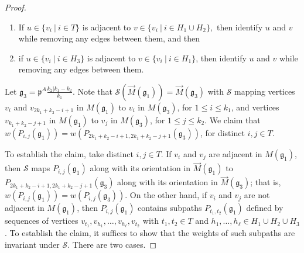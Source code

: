 \documentclass[letterpaper,10pt]{article}
\begin{document}
\begin{proof}
\begin{enumerate}
    \item If $u\in \{v_i~|~i\in T\}$ is adjacent to $v\in \{v_i~|~i\in H_1\cup H_2\},$ then identify $u$ and $v$ while removing any edges between them, and then
    \item if $u\in \{v_i~|~i\in H_3\}$ is adjacent to $v\in \{v_i~|~i\in H_1\}$, then identify $u$ and $v$ while removing any edges between them.
\end{enumerate}
Let $\mathfrak{g}_3=\mathfrak{p}^A\frac{k_2|k_1-k_2}{k_1}.$ Note that $\mathcal{S}(\overrightarrow{M}(\mathfrak{g}_1))=\overrightarrow{M}(\mathfrak{g}_3)$ with $\mathcal{S}$ mapping vertices $v_{i}$ and $v_{2k_1+k_2-i+1}$ in $M(\mathfrak{g}_1)$ to $v_{i}$ in $M(\mathfrak{g}_3)$, for $1\le i\le k_1$, and vertices $v_{k_1+k_2-j+1}$ in $M(\mathfrak{g}_1)$ to $v_{j}$ in $M(\mathfrak{g}_3)$, for $1\le j\le k_2$. We claim that $w(P_{i,j}(\mathfrak{g}_1))=w(P_{2k_1+k_2-i+1,2k_1+k_2-j+1}(\mathfrak{g}_3))$, for distinct $i,j\in T$.

To establish the claim, take distinct $i,j\in T$. If $v_{i}$ and $v_{j}$ are adjacent in $M(\mathfrak{g}_1)$, then $\mathcal{S}$ maps $P_{i,j}(\mathfrak{g}_1)$ along with its orientation in $\overrightarrow{M}(\mathfrak{g}_1)$ to $P_{2k_1+k_2-i+1,2k_1+k_2-j+1}(\mathfrak{g}_3)$ along with its orientation in $\overrightarrow{M}(\mathfrak{g}_3)$; that is, $w(P_{i,j}(\mathfrak{g}_1))=w(P_{i,j}(\mathfrak{g}_3)).$ On the other hand, if $v_{i}$ and $v_{j}$ are not adjacent in $M(\mathfrak{g}_1)$, then $P_{i,j}(\mathfrak{g}_1)$ contains subpaths $P_{t_1,t_2}(\mathfrak{g}_1)$ defined by sequences of vertices $v_{t_1},v_{h_1},\hdots,v_{h_{\ell}},v_{t_2}$ with $t_1,t_2\in T$ and $h_1,\hdots,h_{\ell}\in H_1\cup H_2\cup H_3$. To establish the claim, it suffices to show that the weights of such subpaths are invariant under $\mathcal{S}$. There are two cases.
\bigskip


\end{proof}
\end{document}
